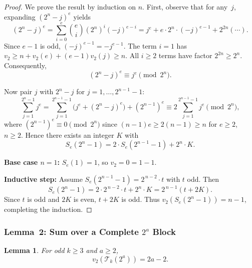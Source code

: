 \documentclass[12pt,a4paper]{article}
\theoremstyle{plain}
\newtheorem{lemma}[theorem]{Lemma}
\theoremstyle{definition}
\newcommand{\vtwo}[1]{v_{2}\!\left(#1\right)}
\newcommand{\Tk}{\mathcal{T}_{k}}
\begin{document}
\begin{proof}
  We prove the result by induction on $n$.  First, observe that for any~$j$,
  expanding $(2^n - j)^e$ yields
  \[
    (2^n - j)^e = \sum_{i=0}^{e} \binom{e}{i} (2^n)^i (-j)^{e-i}
    = j^e + e \cdot 2^n \cdot (-j)^{e-1} + 2^{2n}(\cdots).
  \]
  Since $e-1$ is odd, $(-j)^{e-1} = -j^{e-1}$.  The term $i=1$ has
  $v_2 \ge n + v_2(e) + (e-1)v_2(j) \ge n$.  All $i \ge 2$ terms have
  factor $2^{2n} \ge 2^n$.  Consequently,
  \begin{equation}\label{eq:even-congruence}
    (2^n - j)^e \equiv j^e \pmod{2^n}.
  \end{equation}

  Now pair $j$ with $2^n - j$ for $j = 1, \dots, 2^{n-1}-1$:
  \[
    \sum_{j=1}^{2^n-1} j^e
    = \sum_{j=1}^{2^{n-1}-1} \bigl(j^e + (2^n-j)^e\bigr) + (2^{n-1})^e
    \equiv 2\sum_{j=1}^{2^{n-1}-1} j^e \pmod{2^n},
  \]
  where $(2^{n-1})^e \equiv 0 \pmod{2^n}$ since $(n-1)e \ge 2(n-1) \ge n$
  for $e \ge 2$, $n \ge 2$.  Hence there exists an integer $K$ with
  \[
    S_e(2^n-1) = 2 \cdot S_e(2^{n-1}-1) + 2^n \cdot K.
  \]

  \noindent\textbf{Base case $n=1$:}
  $S_e(1) = 1$, so $v_2 = 0 = 1-1$.~\checkmark

  \noindent\textbf{Inductive step:}
  Assume $S_e(2^{n-1}-1) = 2^{\,n-2} \cdot t$ with $t$ odd.  Then
  \[
    S_e(2^n-1) = 2 \cdot 2^{\,n-2} \cdot t + 2^n \cdot K
    = 2^{\,n-1}(t + 2K).
  \]
  Since $t$ is odd and $2K$ is even, $t + 2K$ is odd.
  Thus $v_2(S_e(2^n-1)) = n-1$, completing the induction.
\end{proof}

\subsubsection{Lemma~2: Sum over a Complete $2^a$ Block}
\label{sec:lemma2}

\begin{lemma}\label{lem:complete-block}
  For odd $k \ge 3$ and $a \ge 2$,
  \begin{equation}\label{eq:complete-block}
    \vtwo{\Tk(2^a)} = 2a - 2.
  \end{equation}
\end{lemma}
\end{document}
